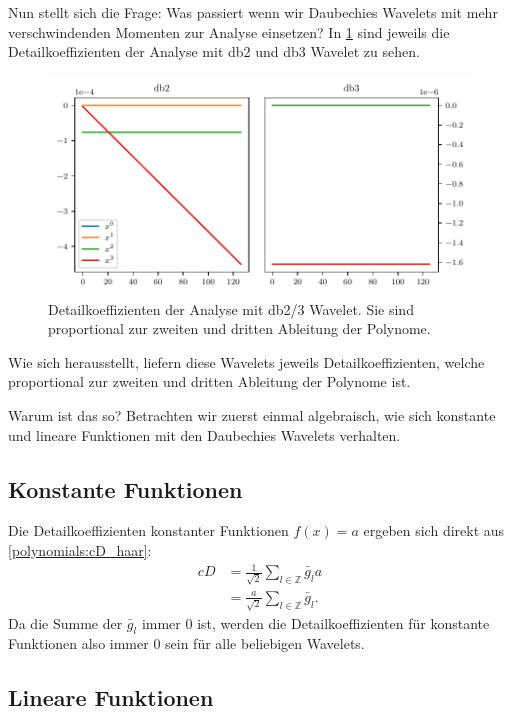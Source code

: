 \begin{refsection}
Nun stellt sich die Frage: Was passiert wenn wir Daubechies Wavelets mit mehr
verschwindenden Momenten zur Analyse einsetzen? In \cref{polynomials:db2_3}
sind jeweils die Detailkoeffizienten der Analyse mit db2 und db3 Wavelet zu
sehen.
\begin{figure}
    \centering
    \includegraphics{papers/polynomials/images/polynomials_signals_db2_3.pdf}
    \caption{Detailkoeffizienten der Analyse mit db2/3 Wavelet. Sie sind
             proportional zur zweiten und dritten Ableitung der
             Polynome.\label{polynomials:db2_3}}
\end{figure}
Wie sich herausstellt, liefern diese Wavelets jeweils Detailkoeffizienten,
welche proportional zur zweiten und dritten Ableitung der Polynome ist.

Warum ist das so? Betrachten wir zuerst einmal algebraisch, wie sich konstante
und lineare Funktionen mit den Daubechies Wavelets verhalten.

\subsection{Konstante Funktionen}
Die Detailkoeffizienten konstanter Funktionen $f(x) = a$ ergeben sich direkt
aus \cref{polynomials:cD_haar}:
\begin{align*}
    cD &= \frac{1}{\sqrt{2}} \sum_{l\in\mathbb Z} \bar{g}_l a \\
       &= \frac{a}{\sqrt{2}} \sum_{l\in\mathbb Z} \bar{g}_l.
\end{align*}
Da die Summe der $\bar{g}_l$ immer 0 ist, werden die Detailkoeffizienten für
konstante Funktionen also immer 0 sein für alle beliebigen Wavelets.

\subsection{Lineare Funktionen}


\end{refsection}
